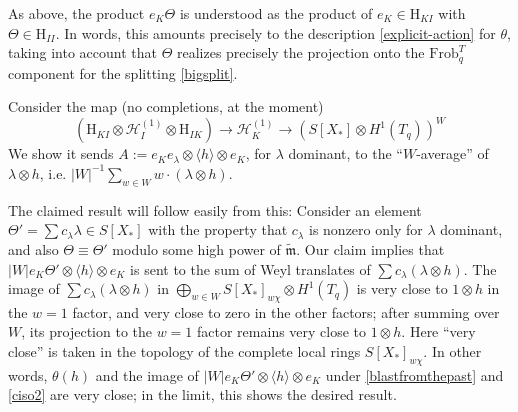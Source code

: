 \documentclass[10pt]{amsart}
\newcommand{\changecolor}{black}
\newcommand{\Frob}{\mathrm{Frob}}
\theoremstyle{remark}
\begin{document}
  
  {\color{\changecolor} As above, the product $e_K \Theta$ is understood as the product of $e_K \in \mathrm{H}_{KI}$ with $\Theta \in \mathrm{H}_{II}$. }
   In words, this amounts precisely to the description \eqref{explicit-action}   for $\theta$,  taking into account that $\Theta$ realizes
 precisely the  projection onto the $\Frob_q^T$ component for the splitting \eqref{bigsplit}.  
  
 \proof 
 
 
 
 
  
Consider the map (no completions, at the moment)    
\begin{equation} \label{compo}  \left( \mathrm{H}_{KI}  \otimes \mathscr{H}_I^{(1)}  \otimes \mathrm{H}_{IK}  \right)  \rightarrow   \mathscr{H}_K^{(1)} \rightarrow \left(  S[X_*] \otimes  H^1(T_q ) \right)^W\end{equation} 
  We show it sends $A := e_{K} e_{\lambda} \otimes \langle h \rangle  \otimes e_K$, for $\lambda$ dominant,   to the ``$W$-average'' of $\lambda \otimes h$,
i.e. $ |W|^{-1} \sum_{w \in W} w \cdot (\lambda \otimes h)$.%
  
   The claimed result will follow easily from this: Consider an element $\Theta' = \sum c_{\lambda} \lambda \in S[X_*]$
 with the property that $c_{\lambda}$ is nonzero only for $\lambda$ dominant, and also $\Theta \equiv \Theta'$ modulo some high power of $\widetilde{\mathfrak{m}}$. 
Our claim implies that  $|W|   e_K \Theta'  \otimes \langle h \rangle \otimes e_K$ is sent to the  sum of Weyl translates of $\sum c_{\lambda} (\lambda \otimes h)$. 
The image of $\sum c_{\lambda} (\lambda \otimes h)$ in $\bigoplus_{w \in W} S[X_*]_{w \chi} \otimes H^1(T_q)$  is
 very close to  $1 \otimes h$ in the $w=1$ factor, and very close  to zero in the other factors; 
 after summing over $W$, its projection  
 to the $w=1$ factor remains very close  to $1 \otimes h$.
  Here ``very close'' is taken in the topology
 of the complete local rings $S[X_*]_{w \chi}$. 
In other words, $\theta(h)$ and the image of $|W|   e_K \Theta'  \otimes \langle h \rangle \otimes  e_K$ 
 under \eqref{blastfromthepast}  and \eqref{ciso2} are very close;
 in the limit, this  shows the desired result. 
 
\end{document}
